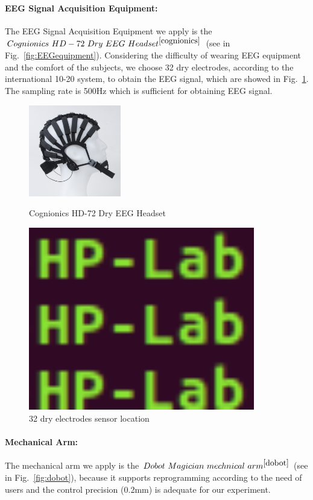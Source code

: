 \documentclass[runningheads,a4paper]{llncs}
\begin{document}
\paragraph{EEG Signal Acquisition Equipment:}
The EEG Signal Acquisition Equipment we apply is the $Cognionics\ HD-72\ Dry\ EEG
\ Headset^{\cite{cognionics}}$ (see in Fig.~\ref{fig:EEGequipment}).
Considering the difficulty of wearing EEG equipment and the comfort of the subjects,
we choose 32 dry electrodes, according to the international 10-20 system,
to obtain the EEG signal, which are showed in Fig.~\ref{fig:sensorloc}.
The sampling rate is 500Hz which is sufficient for obtaining EEG signal.
\begin{figure}
    \centering
    \includegraphics[height=4cm]{images/1}
    \caption{Cognionics HD-72 Dry EEG Headset}
    \label{fig:EEGequipment}
    \centering
    \includegraphics[height=8cm]{images/2}
    \caption{32 dry electrodes sensor location}
    \label{fig:sensorloc}
\end{figure}

\paragraph{Mechanical Arm:}
The mechanical arm we apply is the $Dobot\ Magician\ mechnical\ arm^{\cite{dobot}}$
(see in Fig.~\ref{fig:dobot}), because it supports reprogramming according to
the need of users and the control precision (0.2mm) is adequate for our experiment.
\end{document}
